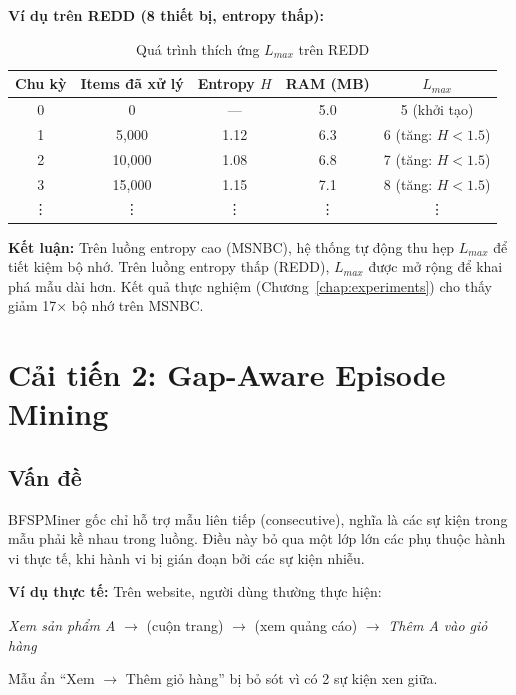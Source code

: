\documentclass[14pt,a4paper,oneside]{extreport}
\begin{document}
\textbf{Ví dụ trên REDD (8 thiết bị, entropy thấp):}

\begin{table}[H]
    \centering
    \caption{Quá trình thích ứng $L_{max}$ trên REDD}
    \label{tab:adaptive_redd}
    \begin{tabular}{ccccc}
        \toprule
        \textbf{Chu kỳ} & \textbf{Items đã xử lý} & \textbf{Entropy $H$} & \textbf{RAM (MB)} & $L_{max}$ \\
        \midrule
        0  & 0      & ---   & 5.0   & 5 (khởi tạo) \\
        1  & 5,000  & 1.12  & 6.3   & 6 (tăng: $H < 1.5$) \\
        2  & 10,000 & 1.08  & 6.8   & 7 (tăng: $H < 1.5$) \\
        3  & 15,000 & 1.15  & 7.1   & 8 (tăng: $H < 1.5$) \\
        \vdots & \vdots & \vdots & \vdots & \vdots \\
        \bottomrule
    \end{tabular}
\end{table}

\textbf{Kết luận:} Trên luồng entropy cao (MSNBC), hệ thống tự động thu hẹp $L_{max}$ để tiết kiệm bộ nhớ. Trên luồng entropy thấp (REDD), $L_{max}$ được mở rộng để khai phá mẫu dài hơn. Kết quả thực nghiệm (Chương~\ref{chap:experiments}) cho thấy giảm 17× bộ nhớ trên MSNBC.

\section{Cải tiến 2: Gap-Aware Episode Mining}
\label{sec:gap}

\subsection{Vấn đề}
BFSPMiner gốc chỉ hỗ trợ mẫu liên tiếp (consecutive), nghĩa là các sự kiện trong mẫu phải kề nhau trong luồng. Điều này bỏ qua một lớp lớn các phụ thuộc hành vi thực tế, khi hành vi bị gián đoạn bởi các sự kiện nhiễu.

\textbf{Ví dụ thực tế:} Trên website, người dùng thường thực hiện:
\begin{center}
    \textit{Xem sản phẩm A} $\rightarrow$ (cuộn trang) $\rightarrow$ (xem quảng cáo) $\rightarrow$ \textit{Thêm A vào giỏ hàng}
\end{center}
Mẫu ẩn ``Xem $\rightarrow$ Thêm giỏ hàng'' bị bỏ sót vì có 2 sự kiện xen giữa.
\end{document}
